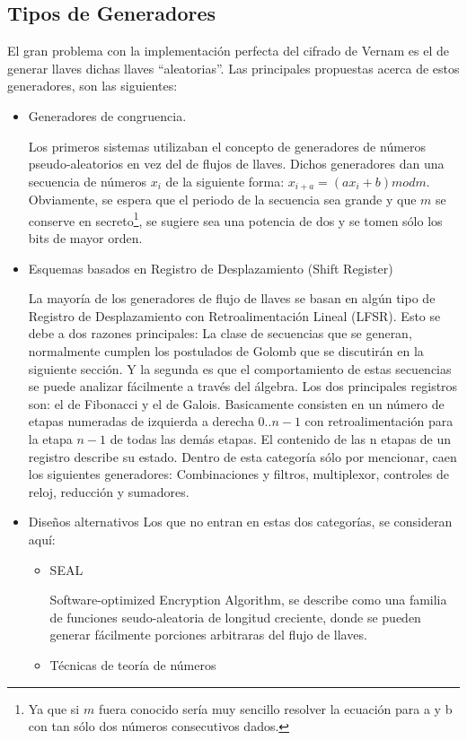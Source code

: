 \subsection{Tipos de Generadores}
El gran problema con la implementación perfecta del cifrado de Vernam es el de generar llaves dichas llaves ``aleatorias''. Las principales propuestas acerca de estos generadores, son las siguientes:
\begin{itemize}
	\item Generadores de congruencia.
	
	Los primeros sistemas utilizaban el concepto de generadores de números pseudo-aleatorios en vez del de flujos de llaves. Dichos generadores dan una secuencia de números $x_i$ de la siguiente forma:
	$x_{i+a} = (ax_i +b) mod m$.
	Obviamente, se espera que el periodo de la secuencia sea grande y que $m$ se conserve en secreto\footnote{Ya que si $m$ fuera conocido sería muy sencillo resolver la ecuación para a y b con tan sólo dos números consecutivos dados.}, se sugiere sea una potencia de dos y se tomen sólo los bits de mayor orden. 
	\item Esquemas basados en Registro de Desplazamiento (Shift Register)
	
	La mayoría de los generadores de flujo de llaves se basan en algún tipo de Registro de Desplazamiento con Retroalimentación Lineal (LFSR). Esto se debe a dos razones principales: La clase de secuencias que se generan, normalmente cumplen los postulados de Golomb que se discutirán en la siguiente sección. Y la segunda es que el comportamiento de estas secuencias se puede analizar fácilmente a través del álgebra.
	Los dos principales registros son: el de Fibonacci y el de Galois. Basicamente consisten en un número de etapas numeradas de izquierda a derecha $0..n-1$ con retroalimentación para la etapa $n-1$ de todas las demás etapas. El contenido de las n etapas  de un registro describe su estado.
	Dentro de esta categoría sólo por mencionar, caen los siguientes generadores:
	Combinaciones y filtros, multiplexor, controles de reloj, reducción y sumadores.
	\item Diseños alternativos
	Los que no entran en estas dos categorías, se consideran aquí:
		\begin{itemize}
			\item SEAL
			
			Software-optimized Encryption Algorithm, se describe como una familia de funciones seudo-aleatoria de longitud creciente, donde se pueden generar fácilmente porciones arbitraras del flujo de llaves.
			\item Técnicas de teoría de números
			

\end{itemize}
\end{itemize}
